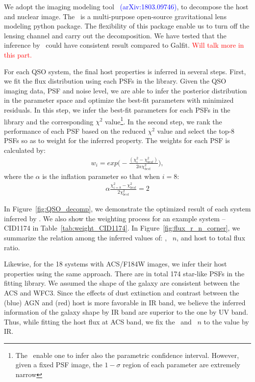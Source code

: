 \documentclass[apj]{emulateapj}
\begin{document}
We adopt the imaging modeling tool \lenstronomy\ \textcolor{blue}{(arXiv:1803.09746)}, to decompose the host and nuclear image. The \lenstronomy\ is a multi-purpose open-source gravitational lens modeling python package. 
The flexibility of this package enable us to turn off the lensing channel and carry out the decomposition.
We have tested that the inference by \lenstronomy\ could have consistent result compared to {\sc Galfit}. \textcolor{red}{Will talk more in this part.}

For each QSO system, the final host properties is inferred in several steps. First, we fit the flux distribution using each PSFs in the library. Given the QSO imaging data, PSF and noise level, we are able to infer the posterior distribution in the parameter space and optimize the best-fit parameters with minimized residuals. In this step, we infer the best-fit parameters for each PSFs in the library and the corresponding $\chi^2$ value\footnote{The \lenstronomy\ enable one to infer also the parametric confidence interval. However, given a fixed PSF image, the $1-\sigma$ region of each parameter are extremely narrow}. In the second step, we rank the performance of each PSF based on the reduced $\chi^2$ value and select the top-8 PSFs so as to weight for the inferred property. The weights for each PSF is calculated by:
\begin{eqnarray}
\label{eq:weights}
w_i = exp \big(-\frac{ (\chi_i ^2 - \chi_{best} ^2 )}{2\alpha \chi_{best} ^2} \big),
\end{eqnarray} 
where the $\alpha$ is the inflation parameter so that when $i=8$:
\begin{eqnarray}
\label{eq:alpha}
\alpha \frac{ \chi_{i=8} ^2 - \chi_{best} ^2 }{2 \chi_{best} ^2} = 2
\end{eqnarray} 


In Figure~\ref{fig:QSO_decomp}, we demonstrate the optimized result of each system inferred by \lenstronomy. We also show the weighting process for an example system -- CID1174 in Table~\ref{tab:weight_CID1174}. In Figure~\ref{fig:flux_r_n_corner}, we summarize the relation among the inferred values of: \Reff, \sersic\ $n$, and host to total flux ratio. 

Likewise, for the 18 systems with ACS/F184W images, we infer their host properties using the same approach. There are in total 174 star-like PSFs in the fitting library. We assumed the shape of the galaxy are consistent between the ACS and WFC3. Since the effects of dust extinction and contrast between the (blue) AGN and (red) host is more favorable in IR band, we believe the inferred information of the galaxy shape by IR band are superior to the one by UV band. Thus, while fitting the host flux at ACS band, we fix the \Reff\ and \sersic\ $n$ to the value by IR.
\end{document}
